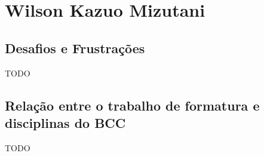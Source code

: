 \chapter{Wilson Kazuo Mizutani}
\label{sec:wil_subjetiva}

\section{Desafios e Frustrações}
\label{sec:wil:desafios_frustracoes}

TODO

\section{Relação entre o trabalho de formatura e disciplinas do BCC}
\label{sec:wil:relacao_disciplinas_bcc}

TODO

